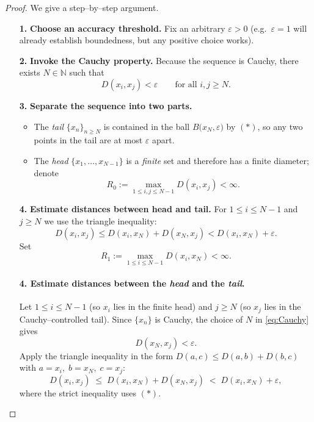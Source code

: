 \documentclass[12pt]{article}
\theoremstyle{definition} %
\theoremstyle{plain} %
\begin{document}
\begin{proof}
  We give a step–by–step argument.

  \begin{enumerate}
      \item[\textbf{1.}] \textbf{Choose an accuracy threshold.}  
            Fix an arbitrary $\varepsilon>0$ (e.g.\ $\varepsilon=1$ will
            already establish boundedness, but any positive choice works).

      \item[\textbf{2.}] \textbf{Invoke the Cauchy property.}  
            Because the sequence is Cauchy, there exists
            $N\in\mathbb N$ such that
            \[
                D(x_i,x_j)<\varepsilon
                \qquad\text{for all }i,j\ge N.
            \tag{$\ast$}
            \]

      \item[\textbf{3.}] \textbf{Separate the sequence into two parts.}
            \begin{itemize}
               \item The \emph{tail}
                     $\{x_n\}_{n\ge N}$ is contained in the ball
                     $B\bigl(x_N,\varepsilon\bigr)$ by $(\ast)$,
                     so any two points in the tail are at most
                     $\varepsilon$ apart.
               \item The \emph{head}
                     $\{x_1,\dots,x_{N-1}\}$ is a \emph{finite} set and
                     therefore has a finite diameter; denote
                     \[
                         R_0
                         :=\max_{1\le i,j\le N-1}D(x_i,x_j)
                         <\infty.
                     \]
            \end{itemize}

      \item[\textbf{4.}] \textbf{Estimate distances between head and tail.}  
            For $1\le i\le N-1$ and $j\ge N$ we use the triangle inequality:
            \[
                D(x_i,x_j)
                \le D(x_i,x_N)+D(x_N,x_j)
                < D(x_i,x_N)+\varepsilon.
            \]
            Set
            \[
                R_1:=\max_{1\le i\le N-1}D(x_i,x_N)<\infty.
            \]
            \paragraph{4.  Estimate distances between the \emph{head} and the \emph{tail}.}
            Let \(1\le i\le N-1\) (so \(x_i\) lies in the finite head) and \(j\ge N\) (so \(x_j\) lies in the Cauchy–controlled tail).  
            Since \(\{x_n\}\) is Cauchy, the choice of \(N\) in \eqref{eq:Cauchy} gives  
            \[
            D(x_N,x_j)<\varepsilon . \tag{\(*\)}
            \]
            Apply the triangle inequality in the form \(D(a,c)\le D(a,b)+D(b,c)\) with  
            \(a=x_i,\; b=x_N,\; c=x_j\):
            \[
            D(x_i,x_j)\;\le\;D(x_i,x_N)+D(x_N,x_j)
                         \;<\;D(x_i,x_N)+\varepsilon ,
            \]
            where the strict inequality uses \((*)\).
            

\end{enumerate}
\end{proof}
\end{document}
